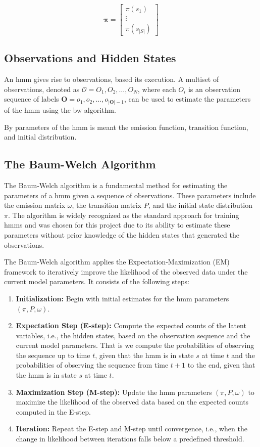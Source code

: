 \[
    \pmb{\pi} = \begin{bmatrix}
              \pi(s_1) \\
              \vdots   \\
              \pi(s_{|S|})
    \end{bmatrix}
\]

\subsection{Observations and Hidden States}\label{subsec:observations-hidden-states}
An \gls{hmm} gives rise to observations, based its execution.
A multiset of observations, denoted as  $\mathcal{O} = {O_1, O_2, \ldots, O_N}$, where each $O_i$ is an observation sequence of labels $\mathbf{O} = o_1, o_2, \ldots, o_{|\mathbf{O}|-1}$, can be used to estimate the parameters of the \gls{hmm} using the \gls{bw} algorithm.

By parameters of the \gls{hmm} is meant the emission function, transition function, and initial distribution.

\subsection{The Baum-Welch Algorithm}\label{subsec:baum-welch}
The Baum-Welch algorithm is a fundamental method for estimating the parameters of a \gls{hmm} given a sequence of observations.
These parameters include the emission matrix $\omega$, the transition matrix $P$, and the initial state distribution $\pi$.
The algorithm is widely recognized as the standard approach for training \glspl{hmm} and was chosen for this project due to its ability to estimate these parameters without prior knowledge of the hidden states that generated the observations.

The Baum-Welch algorithm applies the Expectation-Maximization (EM) framework to iteratively improve the likelihood of the observed data under the current model parameters.
It consists of the following steps:

\begin{enumerate}
    \item \textbf{Initialization:} Begin with initial estimates for the \gls{hmm} parameters $(\pi, P, \omega)$.
    \item \textbf{Expectation Step (E-step):} Compute the expected counts of the latent variables, i.e., the hidden states, based on the observation sequence and the current model parameters.
    That is we compute the probabilities of observing the sequence up to time $t$, given that the \gls{hmm} is in state $s$ at time $t$ and the probabilities of observing the sequence from time $t+1$ to the end, given that the \gls{hmm} is in state $s$ at time $t$.
    \item \textbf{Maximization Step (M-step):} Update the \gls{hmm} parameters $(\pi, P, \omega)$ to maximize the likelihood of the observed data based on the expected counts computed in the E-step.
    \item \textbf{Iteration:} Repeat the E-step and M-step until convergence, i.e., when the change in likelihood between iterations falls below a predefined threshold.
\end{enumerate}

